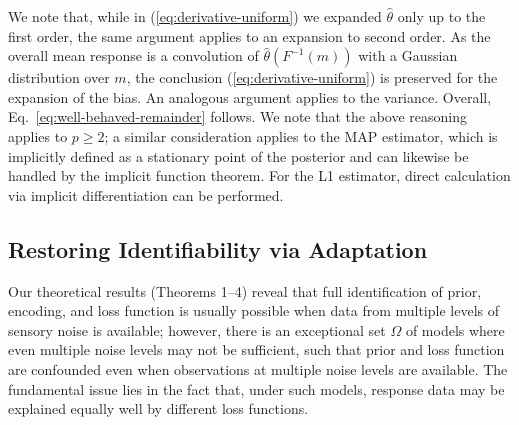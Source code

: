 We note that, while in (\ref{eq:derivative-uniform}) we expanded $\widehat{\theta}$ only up to the first order, the same argument applies to an expansion to second order.
As the overall mean response is a convolution of $\widehat{\theta}(F^{-1}(m))$ with a Gaussian distribution over $m$, the conclusion (\ref{eq:derivative-uniform}) is preserved for the expansion of the bias.
An analogous argument applies to the variance.
Overall, Eq.~\ref{eq:well-behaved-remainder} follows.
We note that the above reasoning applies to $p \geq 2$; a similar consideration applies to the MAP estimator, which is implicitly defined as a stationary point of the posterior and can likewise be handled by the implicit function theorem. For the L1 estimator, direct calculation via implicit differentiation can be performed.




\subsection{Restoring Identifiability via Adaptation}\label{sec:recover-adaptation}

Our theoretical results (Theorems 1--4) reveal that full identification of prior, encoding, and loss function is usually possible when data from multiple levels of sensory noise is available; however, there is an exceptional set $\Omega$ of models where even multiple noise levels may not be sufficient, such that prior and loss function are confounded even when observations at multiple noise levels are available. The fundamental issue lies in the fact that, under such models, response data may be explained equally well by different loss functions.


